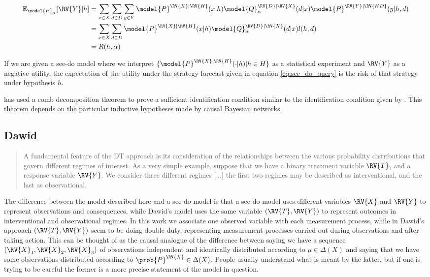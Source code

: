 \begin{align}
    \mathbb{E}_{\model{P}_{\alpha}}[\RV{Y}|h] &= \sum_{x\in X} \sum_{d\in D} \sum_{y\in Y} \model{P}^{\RV{X}|\RV{H}}(x|h) \model{Q}_\alpha^{\RV{D}|\RV{X}}(d|x) \model{P}^{\RV{Y}|\RV{HD}}(y|h,d)\\
    &= \sum_{x\in X} \sum_{d\in D} \model{P}^{\RV{X}|\RV{H}}(x|h) \model{Q}_\alpha^{\RV{D}|\RV{X}}(d|x) l(h,d)\\
    &= R(h,\alpha)
\end{align}

If we are given a see-do model where we interpret $\{\model{P}^{\RV{X}|\RV{H}}(\cdot|h)|h\in H\}$ as a statistical experiment and $\RV{Y}$ as a negative utility, the expectation of the utility under the strategy forecast given in equation \ref{eq:see_do_query} is the risk of that strategy under hypothesis $h$.


\citet{jacobs_causal_2019} has used a comb decomposition theorem to prove a sufficient identification condition similar to the identification condition given by \citet{tian2002general}. This theorem depends on the particular inductive hypotheses made by causal Bayesian networks.

\subsection{Dawid}
\begin{quote}
A fundamental feature of the DT approach is its consideration of the relationships between the various probability distributions that govern different regimes of interest. As a very simple example, suppose that we have a binary treatment variable $\RV{T}$, and a response variable $\RV{Y}$. We consider three different regimes [...] the first two regimes may be described as interventional, and the last as observational.
\end{quote}

The difference between the model described here and a see-do model is that a see-do model uses different variables $\RV{X}$ and $\RV{Y}$ to represent observations and consequences, while Dawid's model uses the same variable $(\RV{T},\RV{Y})$ to represent outcomes in interventional and observational regimes. In this work we associate one observed variable with each measurement process, while in Dawid's approach $(\RV{T},\RV{Y})$ seem to be doing double duty, representing measurement processes carried out during observations and after taking action. This can be thought of as the causal analogue of the difference between saying we have a sequence $(\RV{X}_1,\RV{X}_2,\RV{X}_3)$ of observations independent and identically distributed according to $\mu\in \Delta(X)$ and saying that we have some observations distributed according to $\prob{P}^{\RV{X}}\in \Delta(X)$. People usually understand what is meant by the latter, but if one is trying to be careful the former is a more precise statement of the model in question.

